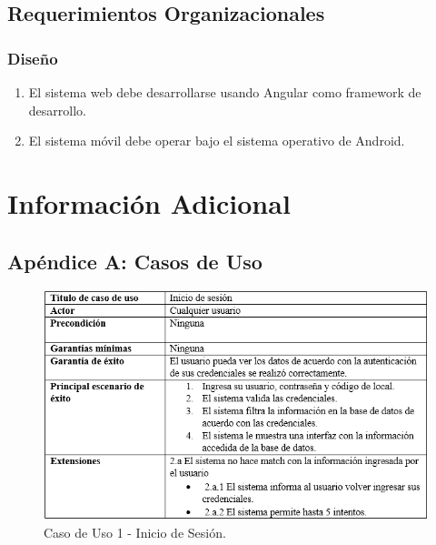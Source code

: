 \documentclass{scrreprt}
\begin{document}
\section{Requerimientos Organizacionales}
\subsection{Diseño}
\begin{enumerate}
    \item El sistema web debe desarrollarse usando Angular como framework de desarrollo. 
    \item El sistema móvil debe operar bajo el sistema operativo de Android.
\end{enumerate}

\chapter{Información Adicional}

\section{Apéndice A: Casos de Uso}

\begin{figure}[!htpb]
    \centerline{\includegraphics[scale=.50]{images/case_stiff/stuff1.png}}
    \caption{Caso de Uso 1 - Inicio de Sesión.}
    \label{fig}
\end{figure}
\FloatBarrier
\end{document}
